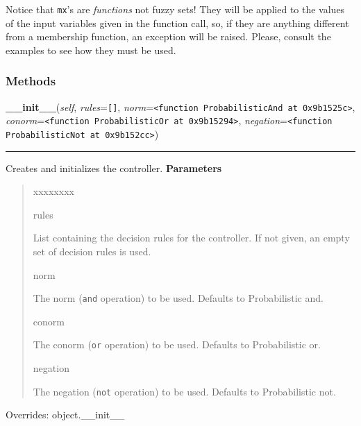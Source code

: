 Notice that \texttt{mx}'s are \emph{functions} not fuzzy sets! They will be applied to
the values of the input variables given in the function call, so, if they
are anything different from a membership function, an exception will be
raised. Please, consult the examples to see how they must be used.


  \subsubsection{Methods}

    \vspace{0.5ex}

\hspace{.8\funcindent}\begin{boxedminipage}{\funcwidth}

    \raggedright \textbf{\_\_init\_\_}(\textit{self}, \textit{rules}={\tt \texttt{[}\texttt{]}}, \textit{norm}={\tt {\textless}function ProbabilisticAnd at 0x9b1525c{\textgreater}}, \textit{conorm}={\tt {\textless}function ProbabilisticOr at 0x9b15294{\textgreater}}, \textit{negation}={\tt {\textless}function ProbabilisticNot at 0x9b152cc{\textgreater}})

    \vspace{-1.5ex}

    \rule{\textwidth}{0.5\fboxrule}
\setlength{\parskip}{2ex}

Creates and initializes the controller.
\setlength{\parskip}{1ex}
      \textbf{Parameters}
      \vspace{-1ex}

      \begin{quote}
        \begin{Ventry}{xxxxxxxx}

          \item[rules]


List containing the decision rules for the controller. If not given,
an empty set of decision rules is used.
          \item[norm]


The norm (\texttt{and} operation) to be used. Defaults to Probabilistic
and.
          \item[conorm]


The conorm (\texttt{or} operation) to be used. Defaults to Probabilistic
or.
          \item[negation]


The negation (\texttt{not} operation) to be used. Defaults to
Probabilistic not.
        \end{Ventry}

      \end{quote}

      Overrides: object.\_\_init\_\_

    \end{boxedminipage}

